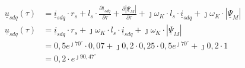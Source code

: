 \begin{solution}
\begin{compactenum}
\begin{align}
\underline{u}_{sdq}(\tau) &= \underline{i}_{sdq} \cdot r_s + l_s \cdot \frac{\partial \underline{i}_{sdq}}{\partial \tau} + \frac{\partial |\underline{\Psi}_M|}{\partial \tau} + \jmath \omega_K \cdot l_s \cdot \underline{i}_{sdq} + \jmath \omega_K \cdot |\underline{\Psi}_M|\\
\underline{u}_{sdq}(\tau) &= \underline{i}_{sdq} \cdot r_s + \jmath \omega_K \cdot l_s \cdot \underline{i}_{sdq} + \jmath \omega_K \cdot |\underline{\Psi}_M|\\
&= 0,5 e^{\jmath 70^\circ} \cdot 0,07 + \jmath 0,2 \cdot 0,25 \cdot 0,5 e^{\jmath 70^\circ}+\jmath 0,2 \cdot 1\\
&=0,2 \cdot e^{\jmath 90,47^\circ}
\end{align}
\end{compactenum}
\end{solution}